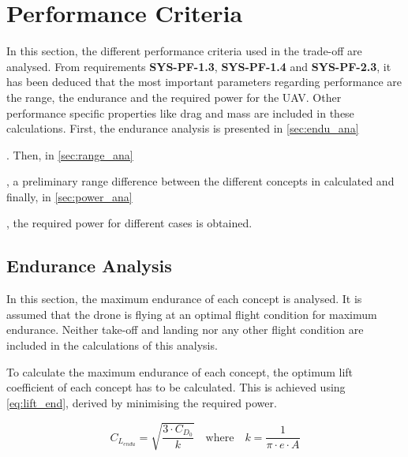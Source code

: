 
\section{Performance Criteria}
\label{sec:perf}

In this section, the different performance criteria used in the trade-off are analysed. From requirements \textbf{SYS-PF-1.3}, \textbf{SYS-PF-1.4} and \textbf{SYS-PF-2.3}, it has been deduced that the most important parameters regarding performance are the range, the endurance and the required power for the UAV. Other performance specific properties like drag and mass are included in these calculations.  
First, the endurance analysis is presented in \autoref{sec:endu_ana} %
. Then, in \autoref{sec:range_ana} %
, a preliminary range difference between the different concepts in calculated and finally, in \autoref{sec:power_ana} %
, the required power for different cases is obtained.

\subsection{Endurance Analysis}
\label{sec:endu_ana}

In this section, the maximum endurance of each concept is analysed. It is assumed that the drone is flying at an optimal flight condition for maximum endurance. Neither take-off and landing nor any other flight condition are included in the calculations of this analysis.

To calculate the maximum endurance of each concept, the optimum lift coefficient of each concept has to be calculated. This is achieved using \autoref{eq:lift_end}, derived by minimising the required power.

\begin{equation}
    C_{L_{endu}} = \sqrt{\frac{3\cdot C_{D_0}}{k}} \quad \mathrm{where} \quad k=\frac{1}{\pi \cdot e\cdot A}
    \label{eq:lift_end}
\end{equation}


